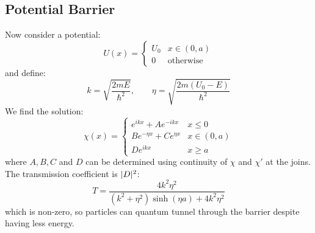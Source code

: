 \documentclass[../Main.tex]{subfiles}
\begin{document}
\subsection{Potential Barrier}
Now consider a potential:
\begin{equation*}
    U(x) =
    \begin{cases}
        U_0 & x \in (0, a) \\
        0 & \text{otherwise}
    \end{cases}
\end{equation*}
and define:
\begin{equation*}
    k = \sqrt{\frac{2mE}{\hbar^2}},\qquad \eta = \sqrt{\frac{2m(U_0 - E)}{\hbar^2}}
\end{equation*}
We find the solution:
\begin{equation*}
    \chi(x) =
    \begin{cases}
        e^{ikx} + Ae^{-ikx} & x \leq 0 \\
        Be^{-\eta x} + Ce^{\eta x} & x \in (0, a) \\
        De^{ikx} & x \geq a
    \end{cases}
\end{equation*}
where $A, B, C$ and $D$ can be determined using continuity of $\chi$ and $\chi'$ at the joins. The transmission coefficient is $\lvert D\rvert^2$:
\begin{equation*}
    T = \frac{4k^2\eta^2}{(k^2+\eta^2)\sinh(\eta a) + 4k^2\eta^2}
\end{equation*}
which is non-zero, so particles can quantum tunnel through the barrier despite having less energy.
\end{document}
